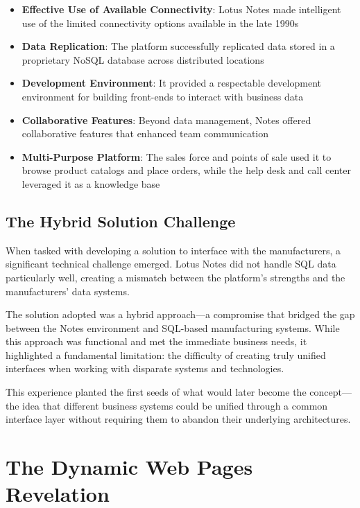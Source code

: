 \begin{itemize}
\item \textbf{Effective Use of Available Connectivity}: Lotus Notes made intelligent use of the limited connectivity options available in the late 1990s
\item \textbf{Data Replication}: The platform successfully replicated data stored in a proprietary NoSQL database across distributed locations
\item \textbf{Development Environment}: It provided a respectable development environment for building front-ends to interact with business data
\item \textbf{Collaborative Features}: Beyond data management, Notes offered collaborative features that enhanced team communication
\item \textbf{Multi-Purpose Platform}: The sales force and points of sale used it to browse product catalogs and place orders, while the help desk and call center leveraged it as a knowledge base
\end{itemize}

\subsection{The Hybrid Solution Challenge}

When tasked with developing a solution to interface with the manufacturers, a significant technical challenge emerged. Lotus Notes did not handle SQL data particularly well, creating a mismatch between the platform's strengths and the manufacturers' data systems.

The solution adopted was a hybrid approach—a compromise that bridged the gap between the Notes environment and SQL-based manufacturing systems. While this approach was functional and met the immediate business needs, it highlighted a fundamental limitation: the difficulty of creating truly unified interfaces when working with disparate systems and technologies.

This experience planted the first seeds of what would later become the \webbaselet{} concept—the idea that different business systems could be unified through a common interface layer without requiring them to abandon their underlying architectures.

\section{The Dynamic Web Pages Revelation}

